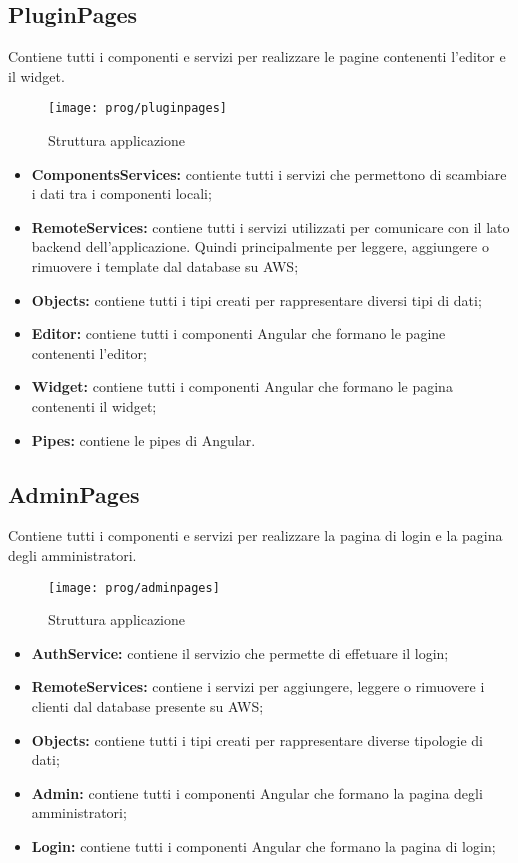 \subsection{PluginPages}
Contiene tutti i componenti e servizi per realizzare le pagine contenenti l'editor e il widget.
\begin{figure}[!h] 
	\centering 
	\texttt{[image: prog/pluginpages]} 
	\caption{Struttura applicazione}
\end{figure}
\begin{itemize}
	\item \textbf{ComponentsServices:} contiente tutti i servizi che permettono di scambiare i dati tra i componenti locali;
	\item \textbf{RemoteServices:} contiene tutti i servizi utilizzati per comunicare con il lato backend dell'applicazione. Quindi principalmente per leggere, aggiungere o rimuovere i template dal database su AWS;
	\item \textbf{Objects:} contiene tutti i tipi creati per rappresentare diversi tipi di dati;
	\item \textbf{Editor:} contiene tutti i componenti Angular che formano le pagine contenenti l'editor;
	\item \textbf{Widget:} contiene tutti i componenti Angular che formano le pagina contenenti il widget;
	\item \textbf{Pipes:} contiene le pipes di  Angular.
\end{itemize}
\newpage
\subsection{AdminPages}
Contiene tutti i componenti e servizi per realizzare la pagina di login e la pagina degli amministratori.
\begin{figure}[!h] 
	\centering 
	\texttt{[image: prog/adminpages]} 
	\caption{Struttura applicazione}
\end{figure}
\begin{itemize}
	\item \textbf{AuthService:} contiene il servizio che permette di effetuare il login;
	\item \textbf{RemoteServices:} contiene i servizi per aggiungere, leggere o rimuovere i clienti dal database presente su AWS;
	\item \textbf{Objects:} contiene tutti i tipi creati per rappresentare diverse tipologie di dati;
	\item \textbf{Admin:} contiene tutti i componenti Angular che formano la pagina degli amministratori;
	\item \textbf{Login:} contiene tutti i componenti Angular che formano la pagina di login;
\end{itemize}
